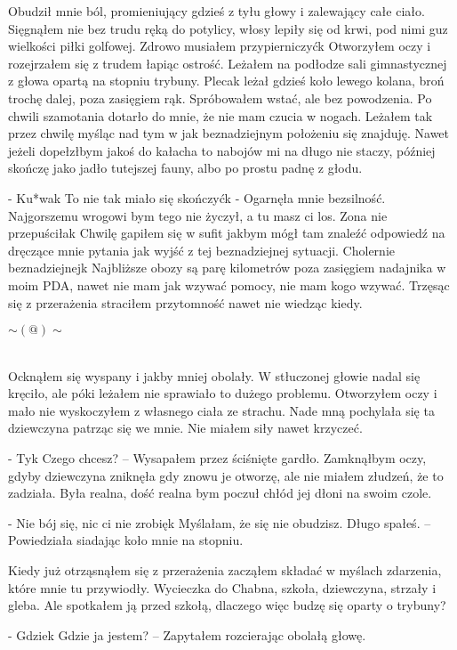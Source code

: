 \documentclass[../MAIN.tex]{subfiles}
\begin{document}

Obudził mnie ból, promieniujący gdzieś z tyłu głowy i zalewający całe ciało. Sięgnąłem nie bez trudu ręką do potylicy, włosy lepiły się od krwi, pod nimi guz wielkości piłki golfowej. Zdrowo musiałem przypierniczyć\3k Otworzyłem oczy i rozejrzałem się z trudem łapiąc ostrość. Leżałem na podłodze sali gimnastycznej z głowa opartą na stopniu trybuny. Plecak leżał gdzieś koło lewego kolana, broń trochę dalej, poza zasięgiem rąk. Spróbowałem wstać, ale bez powodzenia. Po chwili szamotania dotarło do mnie, że nie mam czucia w nogach. Leżałem tak przez chwilę myśląc nad tym w jak beznadziejnym położeniu się znajduję. Nawet jeżeli dopełzłbym jakoś do kałacha to nabojów mi na długo nie staczy, później skończę jako jadło tutejszej fauny, albo po prostu padnę z głodu.

- Ku*wa\3k To nie tak miało się skończyć\3k - Ogarnęła mnie bezsilność. Najgorszemu wrogowi bym tego nie życzył, a tu masz ci los. Zona nie przepuściła\3k Chwilę gapiłem się w sufit jakbym mógł tam znaleźć odpowiedź na dręczące mnie pytania jak wyjść z tej beznadziejnej sytuacji. Cholernie beznadziejnej\3k Najbliższe obozy są parę kilometrów poza zasięgiem nadajnika w moim PDA, nawet nie mam jak wzywać pomocy, nie mam kogo wzywać. Trzęsąc się z przerażenia straciłem przytomność nawet nie wiedząc kiedy.
\\
\centerline{$\sim(@)\sim$}
\\
Ocknąłem się wyspany i jakby mniej obolały. W stłuczonej głowie nadal się kręciło, ale póki leżałem nie sprawiało to dużego problemu. Otworzyłem oczy i mało nie wyskoczyłem z własnego ciała ze strachu. Nade mną pochylała się ta dziewczyna patrząc się we mnie. Nie miałem siły nawet krzyczeć.

- Ty\3k Czego chcesz? – Wysapałem przez ściśnięte gardło. Zamknąłbym oczy, gdyby dziewczyna zniknęła gdy znowu je otworzę, ale nie miałem złudzeń, że to zadziała. Była realna, dość realna bym poczuł chłód jej dłoni na swoim czole.

- Nie bój się, nic ci nie zrobię\3k Myślałam, że się nie obudzisz. Długo spałeś. – Powiedziała siadając koło mnie na stopniu.

Kiedy już otrząsnąłem się z przerażenia zacząłem składać w myślach zdarzenia, które mnie tu przywiodły. Wycieczka do Chabna, szkoła, dziewczyna, strzały i gleba. Ale spotkałem ją przed szkołą, dlaczego więc budzę się oparty o trybuny?

- Gdzie\3k Gdzie ja jestem? – Zapytałem rozcierając obolałą głowę.
\end{document}
